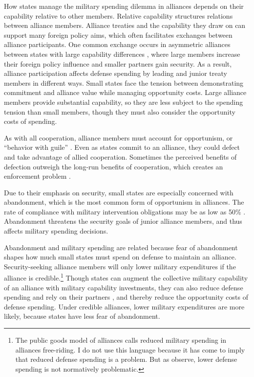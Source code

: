 \documentclass[12pt]{article}
\begin{document}
How states manage the military spending dilemma in alliances depends on their capability relative to other members. 
Relative capability structures relations between alliance members. 
Alliance treaties and the capability they draw on can support many foreign policy aims, which often facilitates exchanges between alliance participants. 
One common exchange occurs in asymmetric alliances between states with large capability differences \citep{Morrow1991}, where large members increase their foreign policy influence and smaller partners gain security. 
As a result, alliance participation affects defense spending by leading and junior treaty members in different ways. 
Small states face the tension between demonstrating commitment and alliance value while managing opportunity costs. 
Large alliance members provide substantial capability, so they are less subject to the spending tension than small members, though they must also consider the opportunity costs of spending. 


As with all cooperation, alliance members must account for opportunism, or ``behavior with guile'' \citep{Williamson1985}. 
Even as states commit to an alliance, they could defect and take advantage of allied cooperation. 
Sometimes the perceived benefits of defection outweigh the long-run benefits of cooperation, which creates an enforcement problem \citep{Fearon1998a, Koremenosetal2001}.


Due to their emphasis on security, small states are especially concerned with abandonment, which is the most common form of opportunism in alliances.
The rate of compliance with military intervention obligations may be as low as 50\% \citep{BerkemeierFuhrmann2018}.
Abandonment threatens the security goals of junior alliance members, and thus affects military spending decisions. 


Abandonment and military spending are related because fear of abandonment shapes how much small states must spend on defense to maintain an alliance. 
Security-seeking alliance members will only lower military expenditures if the alliance is credible.\footnote{The public goods model of alliances calls reduced military spending in alliances free-riding. I do not use this language because it has come to imply that reduced defense spending is a problem. But as \citet[pg. 278]{OlsonZeckhauser1966} observe, lower defense spending is not normatively problematic.}
Though states can augment the collective military capability of an alliance with military capability investments, they can also reduce defense spending and rely on their partners \citep{OlsonZeckhauser1966, Morrow1993, Conybeare1994, SandlerHartley2001}, and thereby reduce the opportunity costs of defense spending. 
Under credible alliances, lower military expenditures are more likely, because states have less fear of abandonment. 
\end{document}
